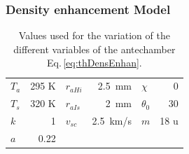		\subsubsection{Density enhancement Model}\label{subsubsec:Densenhan}
		\begin{table}
			\begin{center}
				\begin{tabular}{|l r |l r |l r|}
					\hline
					$T_a$ 	& 295 K	& $r_{aHi}$	& 2.5\, mm	& $\chi$	& 0\degree \\
					$T_s$ 	& 320 K & $r_{aIs}$ & 2\, mm	& $\theta_0$& 30\degree\\	
					$k$		&	1	& $v_{sc}$	& 2.5\, km/s& $m$		& 18 u\\
					$a$		& 0.22	&			&			&			&	\\
					\hline
				\end{tabular}
			\end{center}
			\caption{Values used for the variation of the different variables of the antechamber Eq.\,\eqref{eq:thDensEnhan}.}
			\label{tab:thDensEnhan}
		\end{table}
		
